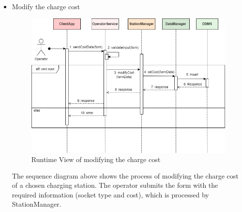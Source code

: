 \documentclass[../main.tex]{subfiles}
\begin{document}
\begin{itemize}
    \newpage
    \item Modify the charge cost
    {
    \vspace{2em}
    \begin{figure}[H]
    \centering
    \includegraphics[width=\textwidth]{runtimeview/op_cost.png}
    \caption{Runtime View of modifying the charge cost}
    \label{fig:op_cost}
    \end{figure}}
    The sequence diagram above shows the process of modifying the charge cost of a chosen charging station. The operator submits the form with the required information (socket type and cost), which is processed by StationManager.
    


\end{itemize}
\end{document}
